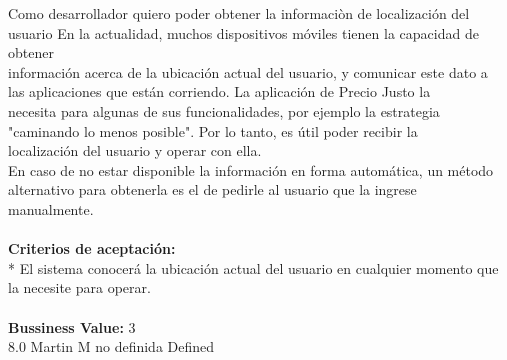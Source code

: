 	{Como desarrollador quiero poder obtener la informaciòn de localización del usuario} %
	{En la actualidad, muchos dispositivos móviles tienen la capacidad de obtener\\
información acerca de la ubicación actual del usuario, y comunicar este dato a\\
las aplicaciones que están corriendo. La aplicación de Precio Justo la\\
necesita para algunas de sus funcionalidades, por ejemplo la estrategia\\
"caminando lo menos posible". Por lo tanto, es útil poder recibir la\\
localización del usuario y operar con ella.\\
En caso de no estar disponible la información en forma automática, un método\\
alternativo para obtenerla es el de pedirle al usuario que la ingrese\\
manualmente.\\
  \\
\textbf{Criterios de aceptación:}\\
* El sistema conocerá la ubicación actual del usuario en cualquier momento que la necesite para operar. \\
  \\
\textbf{Bussiness Value:} 3\\
} %
	{} %
	{8.0} %
	{Martin M} %
	{no definida} %
	{Defined} %


\vspace{20pt}

